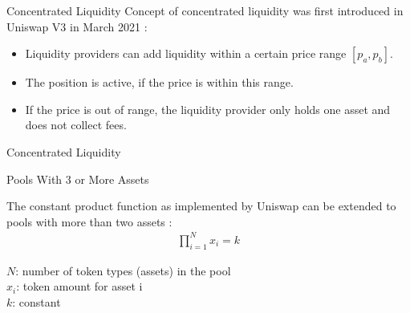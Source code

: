 \documentclass[handout]{beamer}
\begin{document}
\begin{frame}{Concentrated Liquidity}
	Concept of concentrated liquidity was first introduced in Uniswap V3 in March 2021 \cite{UNIV3}:
	\begin{itemize}
		\item<2-> Liquidity providers can add liquidity within a certain price range $[p_a, p_b]$.
		\item<3-> The position is active, if the price is within this range. %
		\item<4-> If the price is out of range, the liquidity provider only holds one asset and does not collect fees.
	\end{itemize}
	\vspace{0.5cm}
\end{frame}


\begin{frame}{Concentrated Liquidity}
	\begin{figure}[h!]
		\begin{center}
			
		\end{center}
	\end{figure}	
\end{frame}


\begin{frame}{Pools With 3 or More Assets}

The constant product function as implemented by Uniswap can be extended to pools with more than two assets \cite{BAL}:
		\begin{align*}
			\prod_{i=1}^N x_i= k
		\end{align*}
		
$N$: number of token types (assets) in the pool\\
$x_i$: token amount for asset i\\
$k$: constant

\end{frame}
\end{document}
